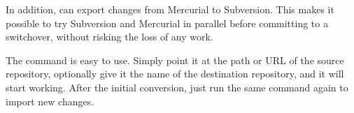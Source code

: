 In addition,  can export changes from Mercurial to
Subversion.  This makes it possible to try Subversion and Mercurial in
parallel before committing to a switchover, without risking the loss
of any work.

The  command is easy to use.  Simply point it
at the path or URL of the source repository, optionally give it the
name of the destination repository, and it will start working.  After
the initial conversion, just run the same command again to import new
changes.


